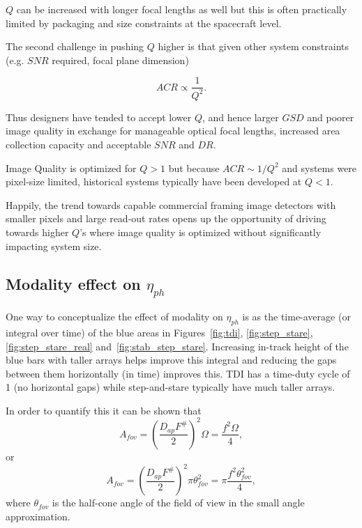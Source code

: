 \documentclass[]{spieman}  %
\begin{document}
$Q$ can be increased with longer focal lengths as well but this is often practically limited by packaging and size constraints at the spacecraft level.

The second challenge in pushing $Q$ higher is that given other system constraints (e.g. $SNR$ required, focal plane dimension)

\begin{equation}
    ACR \propto \frac{1}{Q^2}.
\end{equation}

Thus designers have tended to accept lower $Q$, and hence larger $GSD$ and poorer image quality in exchange for manageable optical focal lengths, increased area collection capacity and acceptable $SNR$ and $DR$.

\begin{observation}[$Q > 1$]
Image Quality is optimized for $Q>1$ but because $ACR \sim 1/Q^2$ and systems were pixel-size limited, historical systems typically have been developed at $Q<1$.
\end{observation}

Happily, the trend towards capable commercial framing image detectors with smaller pixels and large read-out rates opens up the opportunity of driving towards higher $Q$'s where image quality is optimized without significantly impacting system size.

\subsection{Modality effect on $\eta_{ph}$}
\label{sec:eta_ph}

One way to conceptualize the effect of modality on $\eta_{ph}$ is as the time-average (or integral over time) of the blue areas in Figures~\ref{fig:tdi}, \ref{fig:step_stare}, \ref{fig:step_stare_real} and~\ref{fig:stab_step_stare}.  Increasing in-track height of the blue bars with taller arrays helps improve this integral and reducing the gaps between them horizontally (in time) improves this.  TDI has a time-duty cycle of 1 (no horizontal gaps) while step-and-stare typically have much taller arrays.

In order to quantify this it can be shown that
\begin{equation*}
    A_{fov} = \left(\frac{D_{ap}F^\#}{2}\right)^2 \Omega = \frac{f^2 \Omega}{4} ,
\end{equation*}
or 
\begin{equation}
\label{eq:A_fov}
A_{fov} = \left(\frac{D_{ap}F^\#}{2}\right)^2 \pi \theta_{fov}^2 = \pi \frac{f^2 \theta_{fov}^2}{4},
\end{equation}
where $\theta_{fov}$ is the half-cone angle of the field of view in the small angle approximation.
\end{document}
